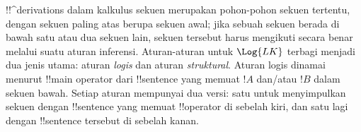 \documentclass[../../../include/open-logic-section]{subfiles}
\begin{document}
!!^{derivation}s dalam kalkulus sekuen merupakan pohon-pohon sekuen
tertentu, dengan sekuen paling atas berupa sekuen awal; jika sebuah
sekuen berada di bawah satu atau dua sekuen lain, sekuen tersebut harus
mengikuti secara benar melalui suatu aturan inferensi. Aturan-aturan untuk
$\Log{LK}$ terbagi menjadi dua jenis utama: aturan \emph{logis} dan aturan
\emph{struktural}. Aturan logis dinamai menurut !!{main operator} dari
!!{sentence} yang memuat $!A$ dan/atau $!B$ dalam sekuen bawah. Setiap
aturan mempunyai dua versi: satu untuk menyimpulkan sekuen dengan
!!{sentence} yang memuat !!{operator} di sebelah kiri, dan satu lagi
dengan !!{sentence} tersebut di sebelah kanan.
\end{document}
